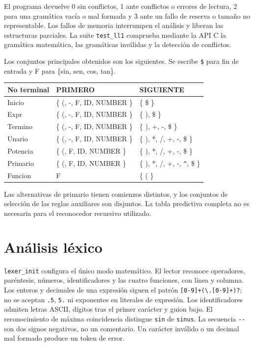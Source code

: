 \documentclass[11pt,a4paper]{article}
\begin{document}
El programa devuelve 0 sin conflictos, 1 ante conflictos o errores de lectura, 2 para una gramática vacía o mal formada y 3 ante un fallo de reserva o tamaño no representable. Los fallos de memoria interrumpen el análisis y liberan las estructuras parciales. La suite \texttt{test\_ll1} comprueba mediante la API C la gramática matemática, las gramáticas inválidas y la detección de conflictos.

Los conjuntos principales obtenidos son los siguientes. Se escribe \texttt{\$} para fin de entrada y F para \{sin, sen, cos, tan\}.
\begin{center}
\begin{tabular}{lll}\toprule
No terminal & PRIMERO & SIGUIENTE \\\midrule
Inicio & \{ (, -, F, ID, NUMBER \} & \{ \$ \} \\
Expr & \{ (, -, F, ID, NUMBER \} & \{ ), \$ \} \\
Termino & \{ (, -, F, ID, NUMBER \} & \{ ), +, -, \$ \} \\
Unario & \{ (, -, F, ID, NUMBER \} & \{ ), *, /, +, -, \$ \} \\
Potencia & \{ (, F, ID, NUMBER \} & \{ ), *, /, +, -, \$ \} \\
Primario & \{ (, F, ID, NUMBER \} & \{ ), *, /, +, -, \verb|^|, \$ \} \\
Funcion & F & \{ ( \} \\\bottomrule
\end{tabular}
\end{center}
Las alternativas de primario tienen comienzos distintos, y los conjuntos de selección de las reglas auxiliares son disjuntos. La tabla predictiva completa no es necesaria para el reconocedor recursivo utilizado.
\section{Análisis léxico}
\texttt{lexer\_init} configura el único modo matemático. El lector reconoce operadores, paréntesis, números, identificadores y las cuatro funciones, con línea y columna. Los enteros y decimales de una expresión siguen el patrón \verb|[0-9]+(\.[0-9]+)?|; no se aceptan \texttt{.5}, \texttt{5.} ni exponentes en literales de expresión. Los identificadores admiten letras ASCII, dígitos tras el primer carácter y guion bajo. El reconocimiento de máxima coincidencia distingue \texttt{sin} de \texttt{sinus}. La secuencia \verb|--| son dos signos negativos, no un comentario. Un carácter inválido o un decimal mal formado produce un token de error.
\end{document}
